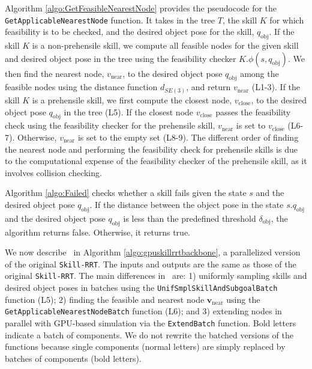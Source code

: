 Algorithm \ref{algo:GetFeasibleNearestNode} provides the pseudocode for the \texttt{GetApplicableNearestNode} function. It takes in the tree $T$, the skill $K$ for which feasibility is to be checked, and the desired object pose for the skill, $q_{\text{obj}}$. If the skill $K$ is a non-prehensile skill, we compute all feasible nodes for the given skill and desired object pose in the tree using the feasibility checker $K.\phi(s, q_{\text{obj}})$. We then find the nearest node, $v_{\text{near}}$, to the desired object pose $q_{\text{obj}}$ among the feasible nodes using the distance function $d_{SE(3)}$, and return $v_{\text{near}}$ (L1-3). If the skill $K$ is a prehensile skill, we first compute the closest node, $v_{\text{close}}$, to the desired object pose $q_{\text{obj}}$ in the tree (L5). If the closest node $v_{\text{close}}$ passes the feasibility check using the feasibility checker for the prehensile skill, $v_{\text{near}}$ is set to $v_{\text{close}}$ (L6-7). Otherwise, $v_{\text{near}}$ is set to the empty set (L8-9). The different order of finding the nearest node and performing the feasibility check for prehensile skills is due to the computational expense of the feasibility checker of the prehensile skill, as it involves collision checking.



Algorithm \ref{algo:Failed} checks whether a skill fails given the state $s$ and the desired object pose $q_{\text{obj}}$. If the distance between the object pose in the state $s.q_{\text{obj}}$ and the desired object pose $q_{\text{obj}}$ is less than the predefined threshold $\delta_{\text{obj}}$, the algorithm returns false. Otherwise, it returns true.



We now describe \gpuskillrrt~in Algorithm \ref{algo:gpuskillrrtbackbone}, a parallelized version of the original \texttt{Skill-RRT}. The inputs and outputs are the same as those of the original \texttt{Skill-RRT}. The main differences in \gpuskillrrt~are: 1) uniformly sampling skills and desired object poses in batches using the \texttt{UnifSmplSkillAndSubgoalBatch} function (L5); 2) finding the feasible and nearest node $\mathbf{v}_\text{near}$ using the \texttt{GetApplicableNearestNodeBatch} function (L6); and 3) extending nodes in parallel with GPU-based simulation via the \texttt{ExtendBatch} function. Bold letters indicate a batch of components. We do not rewrite the batched versions of the functions because single components (normal letters) are simply replaced by batches of components (bold letters).


% 

% 
